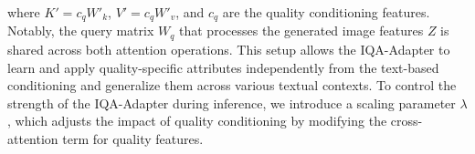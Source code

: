 \noindent where $K' = c_q W'_k$, $V' = c_q W'_v$, and $c_q$ are the quality conditioning features. Notably, the query matrix $W_q$ that processes the generated image features $Z$ is shared across both attention operations. This setup allows the IQA-Adapter to learn and apply quality-specific attributes independently from the text-based conditioning and generalize them across various textual contexts. To control the strength of the IQA-Adapter during inference, we introduce a scaling parameter $\lambda$, which adjusts the impact of quality conditioning by modifying the cross-attention term for quality features.
